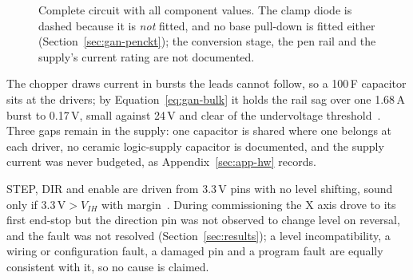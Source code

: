 \begin{figure}[!htbp]
\caption{Complete circuit with all component values. The clamp diode is dashed because it is \emph{not} fitted, and no base pull-down is fitted either (Section~\ref{sec:gan-penckt}); the conversion stage, the pen rail and the supply's current rating are not documented.}
\label{fig:gan-sch}
\end{figure}

The chopper draws current in bursts the leads cannot follow, so a 100\,\textmu F capacitor sits at the drivers; by Equation~\ref{eq:gan-bulk} it holds the rail sag over one 1.68\,A burst to 0.17\,V, small against 24\,V and clear of the undervoltage threshold~\cite{a4988ds}.
Three gaps remain in the supply: one capacitor is shared where one belongs at each driver, no ceramic logic-supply capacitor is documented, and the supply current was never budgeted, as Appendix~\ref{sec:app-hw} records.

STEP, DIR and enable are driven from 3.3\,V pins with no level shifting, sound only if $3.3\,\mathrm{V}>V_{IH}$ with margin~\cite{a4988ds}. During commissioning the X axis drove to its first end-stop but the direction pin was not observed to change level on reversal, and the fault was not resolved (Section~\ref{sec:results}); a level incompatibility, a wiring or configuration fault, a damaged pin and a program fault are equally consistent with it, so no cause is claimed.

